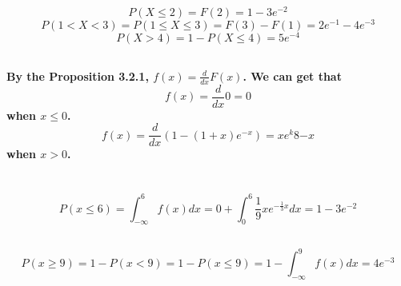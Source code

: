 \documentclass{article}
\begin{document}
    \section{}
        \subsection{}
            \paragraph{
                $$P(X\leq 2)=F(2)=1-3e^{-2}$$
                $$P(1<X<3)=P(1\leq X \leq 3 )=F(3)-F(1)=2e^{-1}-4e^{-3}$$
                $$P(X>4)=1-P(X\leq 4)=5e^{-4}$$
            }
        \subsection{}
            \paragraph{
                By the Proposition 3.2.1,
                $f(x)=\frac{d}{dx}F(x)$.
                We can get that
                $$f(x)=\frac{d}{dx} 0 =0$$
                when $x\leq0$.
                $$f(x)=\frac{d}{dx}(1-(1+x)e^{-x})=xe^k8{-x}$$
                when $x>0$.
            }
    \section{}
        \subsection{}
            \paragraph{
                $$P(x\leq 6)=\int _{-\infty} ^6 f(x)dx=0+\int _0 ^6 \frac{1}{9}xe^{-\frac{1}{3}x} dx=1-3e^{-2}$$
            }
        \subsection{}
            \paragraph{
                $$P(x\geq 9)=1-P(x<9)=1-P(x\leq 9)=1-\int _{-\infty} ^9 f(x)dx=4e^{-3}$$
            }
    \section{}
\end{document}
